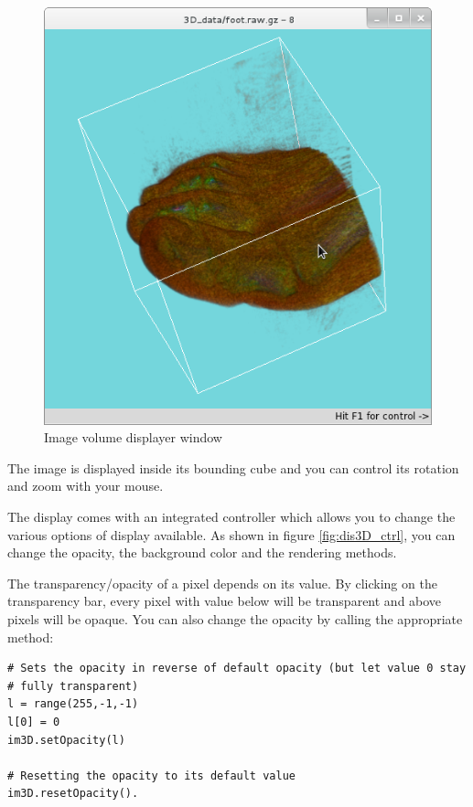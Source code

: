 \documentclass[a4paper,10pt,oneside]{article}
\begin{document}
\begin{figure}
\centering
\includegraphics[scale=0.5]{images/display_base.png}
\caption{Image volume displayer window}
\label{fig:dis3D_base}
\end{figure}

The image is displayed inside its bounding cube and you can control its rotation
and zoom with your mouse.

The display comes with an integrated controller which allows you to change
the various options of display available. As shown in figure \ref{fig:dis3D_ctrl},
you can change the opacity, the background color and the rendering methods.

The transparency/opacity of a pixel depends on its value. By clicking on the 
transparency bar, every pixel with value below will be transparent and above
pixels will be opaque. You can also change the opacity by calling the 
appropriate method:

\lstset{language=Python}
\begin{lstlisting}
# Sets the opacity in reverse of default opacity (but let value 0 stay 
# fully transparent)
l = range(255,-1,-1)
l[0] = 0
im3D.setOpacity(l)

# Resetting the opacity to its default value
im3D.resetOpacity().
\end{lstlisting}
\end{document}
